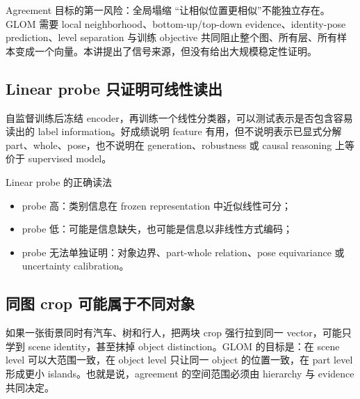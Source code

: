 \begin{warningbox}{Agreement 目标的第一风险：全局塌缩}
“让相似位置更相似”不能独立存在。GLOM 需要 local neighborhood、bottom-up/top-down evidence、identity-pose prediction、level separation 与训练 objective 共同阻止整个图、所有层、所有样本变成一个向量。本讲提出了信号来源，但没有给出大规模稳定性证明。
\end{warningbox}

\subsection{Linear probe 只证明可线性读出}

自监督训练后冻结 encoder，再训练一个线性分类器，可以测试表示是否包含容易读出的 label information。好成绩说明 feature 有用，但不说明表示已显式分解 part、whole、pose，也不说明在 generation、robustness 或 causal reasoning 上等价于 supervised model。


\begin{knowledgebox}{Linear probe 的正确读法}
\begin{itemize}
  \item probe 高：类别信息在 frozen representation 中近似线性可分；
  \item probe 低：可能是信息缺失，也可能是信息以非线性方式编码；
  \item probe 无法单独证明：对象边界、part-whole relation、pose equivariance 或 uncertainty calibration。
\end{itemize}
\end{knowledgebox}

\subsection{同图 crop 可能属于不同对象}

如果一张街景同时有汽车、树和行人，把两块 crop 强行拉到同一 vector，可能只学到 scene identity，甚至抹掉 object distinction。GLOM 的目标是：在 scene level 可以大范围一致，在 object level 只让同一 object 的位置一致，在 part level 形成更小 islands。也就是说，agreement 的空间范围必须由 hierarchy 与 evidence 共同决定。


